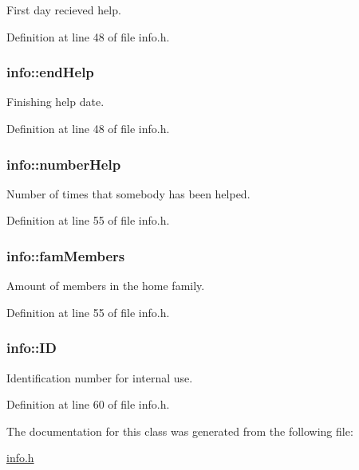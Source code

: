 First day recieved help. 



Definition at line 48 of file info.\+h.

\hypertarget{classinfo_ac9af3f49f3357521492ffaf635897af4}{
\subsubsection[{end\+Help}]{\setlength{\rightskip}{0pt plus 5cm}info\+::end\+Help\hspace{0.3cm}{\ttfamily [private]}}}\label{classinfo_ac9af3f49f3357521492ffaf635897af4}


Finishing help date. 



Definition at line 48 of file info.\+h.

\hypertarget{classinfo_a96e373e7fbb00b84889fba5f87e23c6a}{
\subsubsection[{number\+Help}]{\setlength{\rightskip}{0pt plus 5cm}info\+::number\+Help\hspace{0.3cm}{\ttfamily [private]}}}\label{classinfo_a96e373e7fbb00b84889fba5f87e23c6a}


Number of times that somebody has been helped. 



Definition at line 55 of file info.\+h.

\hypertarget{classinfo_a1b51e61437e4e0b422a49ad00b8a4e65}{
\subsubsection[{fam\+Members}]{\setlength{\rightskip}{0pt plus 5cm}info\+::fam\+Members\hspace{0.3cm}{\ttfamily [private]}}}\label{classinfo_a1b51e61437e4e0b422a49ad00b8a4e65}


Amount of members in the home family. 



Definition at line 55 of file info.\+h.

\hypertarget{classinfo_a3c042f827b9847005666b1ecc5221549}{
\subsubsection[{I\+D}]{\setlength{\rightskip}{0pt plus 5cm}info\+::\+I\+D\hspace{0.3cm}{\ttfamily [private]}}}\label{classinfo_a3c042f827b9847005666b1ecc5221549}


Identification number for internal use. 



Definition at line 60 of file info.\+h.



The documentation for this class was generated from the following file\+:\begin{DoxyCompactItemize}
\item 
\hyperlink{info_8h}{info.\+h}\end{DoxyCompactItemize}
